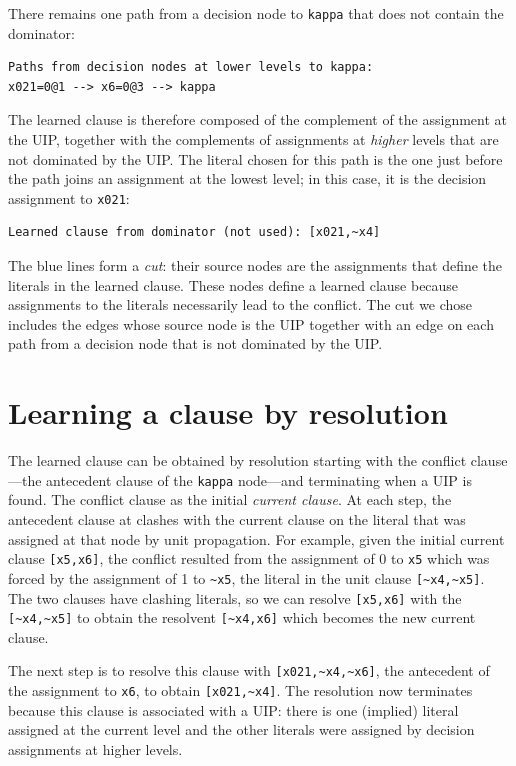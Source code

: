 \documentclass[11pt]{report}
\newcommand*{\p}[1]{\textup{\texttt{#1}}}
\begin{document}
There remains one path from a decision node to \p{kappa} that does not
contain the dominator:
\begin{verbatim}
Paths from decision nodes at lower levels to kappa:
x021=0@1 --> x6=0@3 --> kappa
\end{verbatim}

The learned clause is therefore composed of the complement of the
assignment at the UIP, together with the complements of assignments at
\emph{higher} levels that are not dominated by the UIP. The literal
chosen for this path is the one just before the path joins an assignment
at the lowest level; in this case, it is the decision assignment to
\verb+x021+:

\begin{verbatim}
Learned clause from dominator (not used): [x021,~x4]
\end{verbatim}

The blue lines form a \emph{cut}: their source nodes are the
assignments that define the literals in the learned clause. These nodes
define a learned clause because assignments to the literals necessarily
lead to the conflict. The cut we chose includes the edges whose source
node is the UIP together with an edge on each path from a decision node
that is not dominated by the UIP.

\newpage


\section{Learning a clause by resolution}\label{learned.res}

The learned clause can be obtained by resolution starting with the
conflict clause---the antecedent clause of the \p{kappa} node---and
terminating when a UIP is found. The conflict clause as the
initial \emph{current clause}. At each step, the antecedent clause at clashes with the current clause on the literal that was
assigned at that node by unit propagation. For example, given the
initial current clause \verb+[x5,x6]+, the conflict resulted from the assignment of 0 to \p{x5} which was forced by the assignment of 1 to \verb+~x5+, the literal in the unit clause \verb+[~x4,~x5]+. The two clauses have clashing literals, so we can resolve \verb+[x5,x6]+ with the \verb+[~x4,~x5]+ to obtain the resolvent \verb+[~x4,x6]+ which becomes the new current clause.

The next step is to resolve this clause with \verb+[x021,~x4,~x6]+, the antecedent of the assignment to \p{x6}, to obtain \verb+[x021,~x4]+. The resolution now terminates because this clause is associated with a UIP: there is one (implied) literal assigned at the current level and the other literals were assigned by decision assignments at higher levels.
\end{document}
